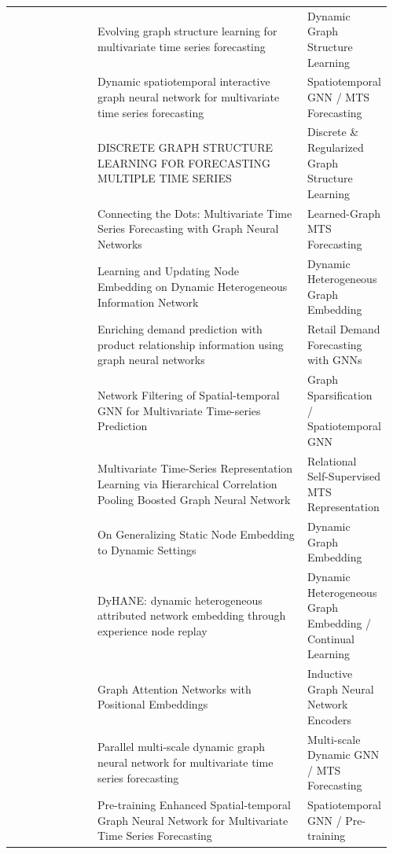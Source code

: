 \begin{longtable}{@{}L{0.23\linewidth} L{0.57\linewidth} L{0.16\linewidth}@{}}
\bottomrule
\endlastfoot
~\parencite{ye_evolving_2025} & Evolving graph structure learning for multivariate time series forecasting & Dynamic Graph Structure Learning\\
~\parencite{gao_dynamic_2023} & Dynamic spatiotemporal interactive graph neural network for multivariate time series forecasting & Spatiotemporal GNN / MTS Forecasting\\
~\parencite{shang2021discretegraphstructurelearning} & DISCRETE GRAPH STRUCTURE LEARNING FOR FORECASTING MULTIPLE TIME SERIES & Discrete \& Regularized Graph Structure Learning\\
~\parencite{wu2020connectingdotsmultivariatetime} & Connecting the Dots: Multivariate Time Series Forecasting with Graph Neural Networks & Learned-Graph MTS Forecasting\\
~\parencite{xie2021dyhine} & Learning and Updating Node Embedding on Dynamic Heterogeneous Information Network & Dynamic Heterogeneous Graph Embedding\\
~\parencite{yilmaz2021demandgnn} & Enriching demand prediction with product relationship information using graph neural networks & Retail Demand Forecasting with GNNs\\
~\parencite{wang2022sparsificationfilteringspatialtemporalgnn} & Network Filtering of Spatial-temporal GNN for Multivariate Time-series Prediction & Graph Sparsification / Spatiotemporal GNN\\
~\parencite{wang2024hiercorrpool} & Multivariate Time-Series Representation Learning via Hierarchical Correlation Pooling Boosted Graph Neural Network & Relational Self-Supervised MTS Representation\\
~\parencite{jin2022generalizing} & On Generalizing Static Node Embedding to Dynamic Settings & Dynamic Graph Embedding\\
~\parencite{martirano2024dyhane} & DyHANE: dynamic heterogeneous attributed network embedding through experience node replay & Dynamic Heterogeneous Graph Embedding / Continual Learning\\
~\parencite{ma_graph_2021} & Graph Attention Networks with Positional Embeddings & Inductive Graph Neural Network Encoders\\
~\parencite{Hou2025PMEDGN} & Parallel multi-scale dynamic graph neural network for multivariate time series forecasting & Multi-scale Dynamic GNN / MTS Forecasting\\
~\parencite{10.1145/3534678.3539396} & Pre-training Enhanced Spatial-temporal Graph Neural Network for Multivariate Time Series Forecasting & Spatiotemporal GNN / Pre-training\\

\end{longtable}

